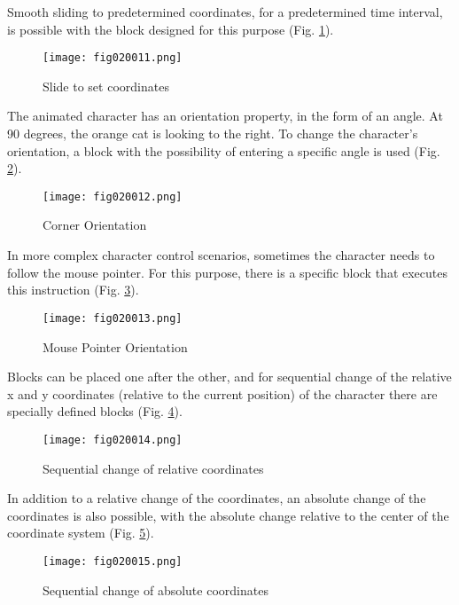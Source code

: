 Smooth sliding to predetermined coordinates, for a predetermined time interval, is possible with the block designed for this purpose (Fig. \ref{fig020011}).

\begin{figure}[H]
   \centering
   \texttt{[image: fig020011.png]}
   \caption{Slide to set coordinates}
\label{fig020011}
\end{figure}

The animated character has an orientation property, in the form of an angle. At 90 degrees, the orange cat is looking to the right. To change the character's orientation, a block with the possibility of entering a specific angle is used (Fig. \ref{fig020012}).

\begin{figure}[H]
   \centering
   \texttt{[image: fig020012.png]}
   \caption{Corner Orientation}
\label{fig020012}
\end{figure}

In more complex character control scenarios, sometimes the character needs to follow the mouse pointer. For this purpose, there is a specific block that executes this instruction (Fig. \ref{fig020013}).

\begin{figure}[H]
   \centering
   \texttt{[image: fig020013.png]}
   \caption{Mouse Pointer Orientation}
\label{fig020013}
\end{figure}

Blocks can be placed one after the other, and for sequential change of the relative x and y coordinates (relative to the current position) of the character there are specially defined blocks (Fig. \ref{fig020014}).

\begin{figure}[H]
   \centering
   \texttt{[image: fig020014.png]}
   \caption{Sequential change of relative coordinates}
\label{fig020014}
\end{figure}

In addition to a relative change of the coordinates, an absolute change of the coordinates is also possible, with the absolute change relative to the center of the coordinate system (Fig. \ref{fig020015}).

\begin{figure}[H]
   \centering
   \texttt{[image: fig020015.png]}
   \caption{Sequential change of absolute coordinates}
\label{fig020015}
\end{figure}

